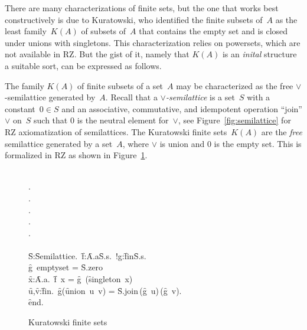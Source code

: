 \iflong
There are many characterizations of finite sets, but the one that
works best constructively is due to Kuratowski, who identified the
finite subsets of~$A$ as the least family~$K(A)$ of subsets of~$A$
that contains the empty set and is closed under unions with
singletons. This characterization relies on powersets, which are not
available in RZ. But the gist of it, namely that $K(A)$ is an
\emph{inital} structure a suitable sort, can be expressed as follows.

\else
%
The family $K(A)$ of finite subsets of a set~$A$ may be characterized
as the free $\vee$-semilattice generated by~$A$.
%
\fi
%
Recall that a \emph{$\vee$-semilattice} is a set~$S$ with a
constant~$0 \in S$ and an associative, commutative, and idempotent
operation ``join'' $\vee$ on~$S$ such that $0$ is the neutral element
for~$\vee$, see Figure~\ref{fig:semilattice} for RZ axiomatization of
semilattices.
%
The Kuratowski finite sets~$K(A)$ are the \emph{free} semilattice
generated by a set~$A$, where $\vee$ is union and $0$ is the empty
set. This is formalized in RZ as shown in Figure~\ref{fig:kuratowski}.
%
\begin{figure}
\begin{showInput}
\\
\qquad {}.\\
\qquad {}.\\
\qquad {}.\\
\qquad {}.\\
\qquad {}.\\
\\
\qquad {} \forall \f{S}:\f{Semilattice}.\ \forall\f{f}:{\f{A.a}\to\f{S.s}}.\ \exists!g:\f{fin}{\to}{\f{S.s}}.\\
\qquad \qquad \qquad \qquad \qquad \f{g\ emptyset} = \f{S.zero}\ \land\\
\qquad \qquad \qquad \qquad \qquad \forall\f{x}:\f{A.a}.\ \f{f\ x} = \f{g}\ (\f{singleton\ x})\ \land\\
\qquad \qquad \qquad \qquad \qquad \forall\f{u},\f{v}:\f{fin}.\ \f{g}(\f{union\ u\ v}) = \f{S.join}\,(\f{g\ u})\,(\f{g\ v}).\\
\f{end}.
\end{showInput}
  \caption{Kuratowski finite sets}
  \label{fig:kuratowski}
\end{figure}
